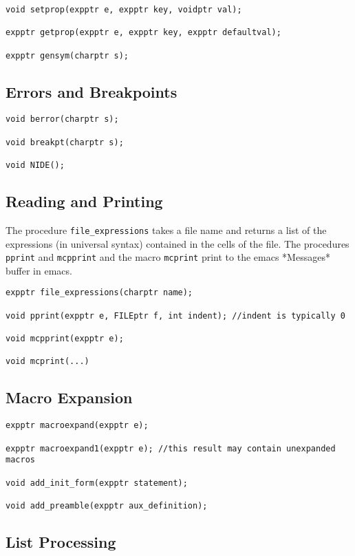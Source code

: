 \documentclass{article}
\begin{document}
\begin{verbatim}
void setprop(expptr e, expptr key, voidptr val);

expptr getprop(expptr e, expptr key, expptr defaultval);

expptr gensym(charptr s);
\end{verbatim}

\subsection{Errors and Breakpoints}

\begin{verbatim}
void berror(charptr s);

void breakpt(charptr s);

void NIDE();
\end{verbatim}

\subsection{Reading and Printing}
The procedure {\tt file\_expressions} takes a file name and returns a
list of the expressions (in universal syntax) contained in the cells
of the file.  The procedures {\tt pprint} and {\tt mcpprint} and the macro {\tt mcprint} print to the emacs *Messages* buffer in
emacs.

\begin{verbatim}
expptr file_expressions(charptr name);

void pprint(expptr e, FILEptr f, int indent); //indent is typically 0

void mcpprint(expptr e);

void mcprint(...)
\end{verbatim}

\subsection{Macro Expansion}

\begin{verbatim}
expptr macroexpand(expptr e);

expptr macroexpand1(expptr e); //this result may contain unexpanded macros

void add_init_form(expptr statement);

void add_preamble(expptr aux_definition);
\end{verbatim}

\subsection{List Processing}
\end{document}

